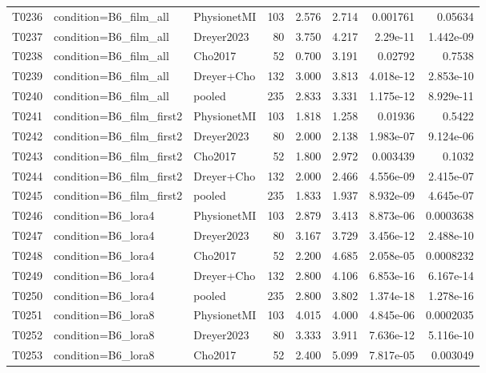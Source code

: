 \begin{longtable}{p{.45in}p{2.6in}p{.75in}rrrrr}
T0236 & condition=B6\_\allowbreak{}film\_\allowbreak{}all & PhysionetMI & 103 & 2.576 & 2.714 & 0.001761 & 0.05634 \\
T0237 & condition=B6\_\allowbreak{}film\_\allowbreak{}all & Dreyer2023 & 80 & 3.750 & 4.217 & 2.29e-11 & 1.442e-09 \\
T0238 & condition=B6\_\allowbreak{}film\_\allowbreak{}all & Cho2017 & 52 & 0.700 & 3.191 & 0.02792 & 0.7538 \\
T0239 & condition=B6\_\allowbreak{}film\_\allowbreak{}all & Dreyer+Cho & 132 & 3.000 & 3.813 & 4.018e-12 & 2.853e-10 \\
T0240 & condition=B6\_\allowbreak{}film\_\allowbreak{}all & pooled & 235 & 2.833 & 3.331 & 1.175e-12 & 8.929e-11 \\
T0241 & condition=B6\_\allowbreak{}film\_\allowbreak{}first2 & PhysionetMI & 103 & 1.818 & 1.258 & 0.01936 & 0.5422 \\
T0242 & condition=B6\_\allowbreak{}film\_\allowbreak{}first2 & Dreyer2023 & 80 & 2.000 & 2.138 & 1.983e-07 & 9.124e-06 \\
T0243 & condition=B6\_\allowbreak{}film\_\allowbreak{}first2 & Cho2017 & 52 & 1.800 & 2.972 & 0.003439 & 0.1032 \\
T0244 & condition=B6\_\allowbreak{}film\_\allowbreak{}first2 & Dreyer+Cho & 132 & 2.000 & 2.466 & 4.556e-09 & 2.415e-07 \\
T0245 & condition=B6\_\allowbreak{}film\_\allowbreak{}first2 & pooled & 235 & 1.833 & 1.937 & 8.932e-09 & 4.645e-07 \\
T0246 & condition=B6\_\allowbreak{}lora4 & PhysionetMI & 103 & 2.879 & 3.413 & 8.873e-06 & 0.0003638 \\
T0247 & condition=B6\_\allowbreak{}lora4 & Dreyer2023 & 80 & 3.167 & 3.729 & 3.456e-12 & 2.488e-10 \\
T0248 & condition=B6\_\allowbreak{}lora4 & Cho2017 & 52 & 2.200 & 4.685 & 2.058e-05 & 0.0008232 \\
T0249 & condition=B6\_\allowbreak{}lora4 & Dreyer+Cho & 132 & 2.800 & 4.106 & 6.853e-16 & 6.167e-14 \\
T0250 & condition=B6\_\allowbreak{}lora4 & pooled & 235 & 2.800 & 3.802 & 1.374e-18 & 1.278e-16 \\
T0251 & condition=B6\_\allowbreak{}lora8 & PhysionetMI & 103 & 4.015 & 4.000 & 4.845e-06 & 0.0002035 \\
T0252 & condition=B6\_\allowbreak{}lora8 & Dreyer2023 & 80 & 3.333 & 3.911 & 7.636e-12 & 5.116e-10 \\
T0253 & condition=B6\_\allowbreak{}lora8 & Cho2017 & 52 & 2.400 & 5.099 & 7.817e-05 & 0.003049 \\

\end{longtable}
